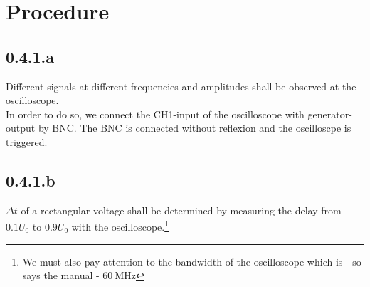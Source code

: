 \section{Procedure}
\subsection{0.4.1.a}
Different signals at different frequencies and amplitudes shall be observed at the oscilloscope.\\
In order to do so, we connect the CH1-input of the oscilloscope with generator-output by BNC. The BNC is connected without reflexion and the oscilloscpe is triggered.
\subsection{0.4.1.b}
$\Delta t$ of a rectangular voltage shall be determined by measuring the delay from $0.1U_0$ to $0.9U_0$ with the oscilloscope.\footnote{We must also pay attention to the bandwidth of the oscilloscope which is - so says the manual - $\SI{60}{\mega\hertz}$}